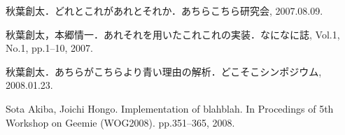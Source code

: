 \item 秋葉創太．どれとこれがあれとそれか．あちらこちら研究会, 2007.08.09.
\item 秋葉創太，本郷情一．あれそれを用いたこれこれの実装．なになに誌, Vol.1, No.1, pp.1--10, 2007.
\item 秋葉創太．あちらがこちらより青い理由の解析．どこそこシンポジウム, 2008.01.23.
\item Sota Akiba, Joichi Hongo.  Implementation of blahblah.  In Procedings of 5th Workshop on Geemie (WOG2008).  pp.351--365, 2008.
